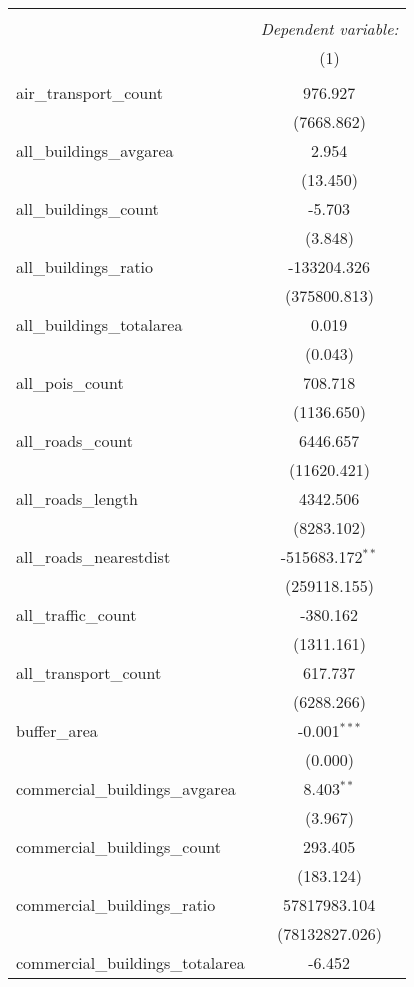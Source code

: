 \begin{table}[!htbp] \centering
\begin{tabular}{@{\extracolsep{5pt}}lc}
\\[-1.8ex]\hline
\hline \\[-1.8ex]
& \multicolumn{1}{c}{\textit{Dependent variable:}} \
\cr \cline{1-2}
\\[-1.8ex] & (1) \\
\hline \\[-1.8ex]
 air_transport_count & 976.927$^{}$ \\
  & (7668.862) \\
 all_buildings_avgarea & 2.954$^{}$ \\
  & (13.450) \\
 all_buildings_count & -5.703$^{}$ \\
  & (3.848) \\
 all_buildings_ratio & -133204.326$^{}$ \\
  & (375800.813) \\
 all_buildings_totalarea & 0.019$^{}$ \\
  & (0.043) \\
 all_pois_count & 708.718$^{}$ \\
  & (1136.650) \\
 all_roads_count & 6446.657$^{}$ \\
  & (11620.421) \\
 all_roads_length & 4342.506$^{}$ \\
  & (8283.102) \\
 all_roads_nearestdist & -515683.172$^{**}$ \\
  & (259118.155) \\
 all_traffic_count & -380.162$^{}$ \\
  & (1311.161) \\
 all_transport_count & 617.737$^{}$ \\
  & (6288.266) \\
 buffer_area & -0.001$^{***}$ \\
  & (0.000) \\
 commercial_buildings_avgarea & 8.403$^{**}$ \\
  & (3.967) \\
 commercial_buildings_count & 293.405$^{}$ \\
  & (183.124) \\
 commercial_buildings_ratio & 57817983.104$^{}$ \\
  & (78132827.026) \\
 commercial_buildings_totalarea & -6.452$^{}$ \\

\end{tabular}
\end{table}
